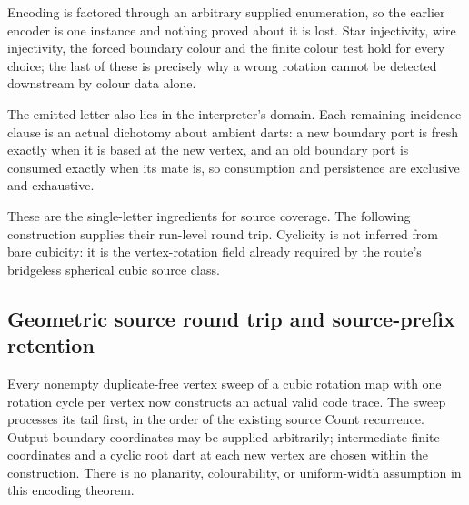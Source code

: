 Encoding is factored through an arbitrary supplied enumeration, so the
earlier encoder is one instance and nothing proved about it is lost. Star
injectivity, wire injectivity, the forced boundary colour and the finite
colour test hold for every choice; the last of these is precisely why a
wrong rotation cannot be detected downstream by colour data alone.

The emitted letter also lies in the interpreter's domain. Each remaining
incidence clause is an actual dichotomy about ambient darts: a new boundary
port is fresh exactly when it is based at the new vertex, and an old boundary
port is consumed exactly when its mate is, so consumption and persistence are
exclusive and exhaustive.

These are the single-letter ingredients for source coverage. The following
construction supplies their run-level round trip. Cyclicity is not inferred
from bare cubicity: it is the vertex-rotation field already required by the
route's bridgeless spherical cubic source class.

\subsection{Geometric source round trip and source-prefix retention}
\label{sec:source-vertex-code-roundtrip}

Every nonempty duplicate-free vertex sweep of a cubic rotation map with one
rotation cycle per vertex now constructs an actual valid code trace. The
sweep processes its tail first, in the order of the existing source Count
recurrence. Output boundary coordinates may be supplied arbitrarily;
intermediate finite coordinates and a cyclic root dart at each new vertex
are chosen within the construction. There is no planarity, colourability,
or uniform-width assumption in this encoding theorem.

